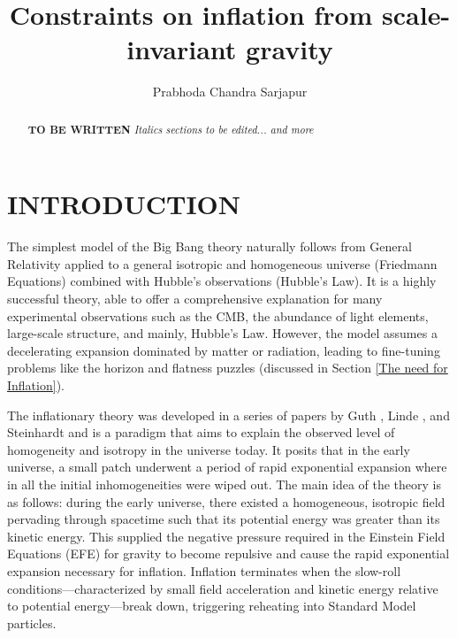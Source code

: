 \documentclass[aps,prd,reprint,preprintnumbers,showpacs,floatfix,nofootinbib,superscript address]{revtex4-2}
\begin{document}
\title{Constraints on inflation from scale-invariant gravity}

\author{Prabhoda Chandra Sarjapur}

\begin{abstract}

\textbf{TO BE WRITTEN}
\textit{Italics sections to be edited... and more}
\end{abstract}

\maketitle
\section{INTRODUCTION}

\indent The simplest model of the Big Bang theory naturally follows from General Relativity applied to a general isotropic and homogeneous universe (Friedmann Equations) combined with Hubble's observations (Hubble's Law).  It is a highly successful theory, able to offer a comprehensive explanation for many experimental observations such as the CMB, the abundance of light elements, large-scale structure, and mainly, Hubble's Law. However, the model assumes a decelerating expansion dominated by matter or radiation, leading to fine-tuning problems like the horizon and flatness puzzles (discussed in Section \ref{The need for Inflation}).


The inflationary theory was developed in a series of papers by Guth \cite{GuthOriginalPaper}, Linde \cite{LINDE1982389}, and Steinhardt \cite{PhysRevLett.48.1220} and is a paradigm that aims to explain the observed level of homogeneity and isotropy in the universe today. It posits that in the early universe, a small patch underwent a period of rapid exponential expansion where in all the initial inhomogeneities were wiped out. The main idea of the theory is as follows: during the early universe, there existed a homogeneous, isotropic field pervading through spacetime such that its potential energy was greater than its kinetic energy. This supplied the negative pressure required in the Einstein Field Equations (EFE) for gravity to become repulsive and cause the rapid exponential expansion necessary for inflation. Inflation terminates when the slow-roll conditions—characterized by small field acceleration and kinetic energy relative to potential energy—break down, triggering reheating into Standard Model particles.
\end{document}
